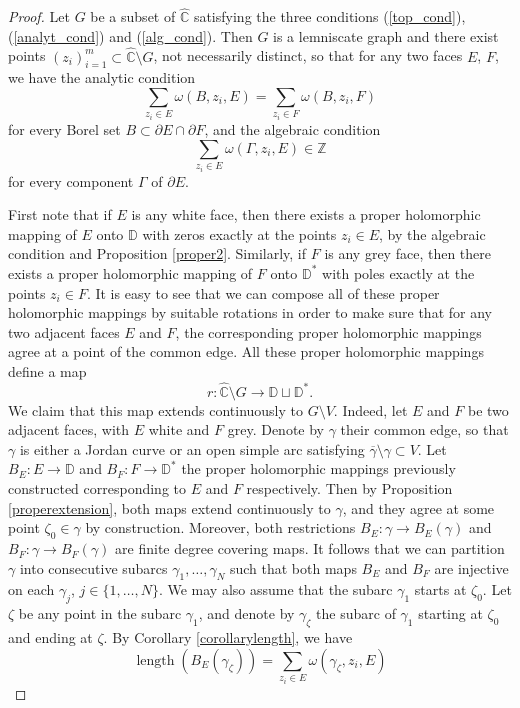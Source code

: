 \documentclass{amsart}
\theoremstyle{plain}
\theoremstyle{definition}
\theoremstyle{remark}
\newcommand{\mD}{\mathbb{D}}
\newcommand{\hC}{\widehat{\mathbb{C}}}
\begin{document}
\begin{proof}
Let $G$ be a subset of $\hC$ satisfying the three conditions (\ref{top_cond}), (\ref{analyt_cond}) and (\ref{alg_cond}). Then $G$ is a lemniscate graph and there exist points $(z_i)_{i=1}^m \subset \hC \setminus G$, not necessarily distinct, so that for any two faces $E$, $F$, we have the analytic condition
$$
\sum_{z_i \in E} \omega(B, z_i, E) = \sum_{z_i \in F} \omega(B, z_i, F)
$$
for every Borel set $B\subset \partial E\cap \partial F$, and the algebraic condition
$$
\sum_{z_i \in E} \omega(\Gamma, z_i, E) \in \mathbb{Z}
$$
for every component $\Gamma$ of $\partial E$.

First note that if $E$ is any white face, then there exists a proper holomorphic mapping of $E$ onto $\mD$ with zeros exactly at the points $z_i \in E$, by the algebraic condition and Proposition \ref{proper2}. Similarly, if $F$ is any grey face, then there exists a proper holomorphic mapping of $F$ onto $\mD^*$ with poles exactly at the points $z_i \in F$. It is easy to see that we can compose all of these proper holomorphic mappings by suitable rotations in order to make sure that for any two adjacent faces $E$ and $F$, the corresponding proper holomorphic mappings agree at a point of the common edge. All these proper holomorphic mappings define a map
$$r: \hC \setminus G \to \mD \sqcup \mD^*.$$
We claim that this map extends continuously to $G \setminus V$. Indeed, let $E$ and $F$ be two adjacent faces, with $E$ white and $F$ grey. Denote by $\gamma$ their common edge, so that $\gamma$ is either a Jordan curve or an open simple arc satisfying $\overline{\gamma} \setminus \gamma \subset V$. Let $B_E:E \to \mD$ and $B_F:F \to \mD^*$ the proper holomorphic mappings previously constructed corresponding to $E$ and $F$ respectively. Then by Proposition \ref{properextension}, both maps extend continuously to $\gamma$, and they agree at some point $\zeta_0 \in \gamma$ by construction. Moreover, both restrictions $B_E:\gamma \to B_E(\gamma)$ and $B_F:\gamma \to B_F(\gamma)$ are finite degree covering maps. It follows that we can partition $\gamma$ into consecutive subarcs $\gamma_1, \dots, \gamma_N$ such that both maps $B_E$ and $B_F$ are injective on each $\gamma_j$, $j \in \{1, \dots, N\}$. We may also assume that the subarc $\gamma_1$ starts at $\zeta_0 $. Let $\zeta$ be any point in the subarc $\gamma_1$, and denote by $\gamma_\zeta$ the subarc of $\gamma_1$ starting at $\zeta_0 $ and ending at $\zeta$. By Corollary \ref{corollarylength}, we have
$$
\operatorname{length}(B_E(\gamma_\zeta))=\sum_{z_i \in E} \omega(\gamma_\zeta, z_i, E)
$$
\end{proof}
\end{document}
